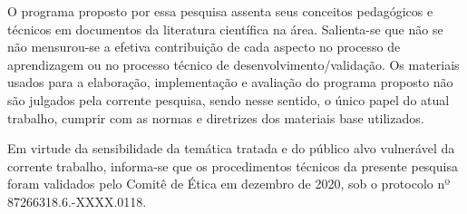 


O programa proposto por essa pesquisa assenta seus conceitos pedagógicos e técnicos em documentos da literatura científica na área. Salienta-se que não se não mensurou-se a efetiva contribuição de cada aspecto no processo de aprendizagem ou no processo técnico de desenvolvimento/validação. Os materiais usados para a elaboração, implementação e avaliação do programa proposto não são julgados pela corrente pesquisa, sendo nesse sentido, o único papel do atual trabalho, cumprir com as normas e diretrizes dos materiais base utilizados. 

Em virtude da sensibilidade da temática tratada e do público alvo vulnerável da corrente trabalho, informa-se que os procedimentos técnicos da presente pesquisa foram validados pelo Comitê de Ética em dezembro de 2020, sob o protocolo nº 87266318.6.-XXXX.0118.

\newpage

 
 
 





